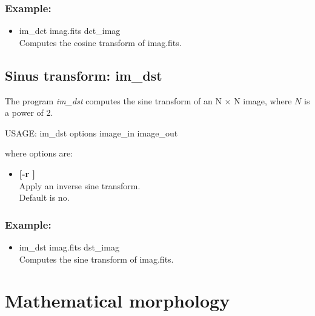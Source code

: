 \subsubsection*{Example:}
\begin{itemize}
\item  im\_dct imag.fits dct\_imag \\
Computes the cosine transform of imag.fits.
\end{itemize}

\subsection{Sinus transform: im\_dst}

The program 
{\em im\_dst} computes the sine transform of an N $\times$ 
N image, where $N$ is a power of 2.
{\bf
\begin{center}
USAGE: im\_dst  options image\_in  image\_out  
\end{center}}
where options are:
\begin{itemize}
\item {\bf[-r ]} \\
Apply an inverse sine transform. \\
Default is no.
\end{itemize}
\subsubsection*{Example:}
\begin{itemize}
\item  im\_dst imag.fits dst\_imag \\
Computes the sine transform of imag.fits.
\end{itemize}
\newpage

\section{Mathematical morphology}
